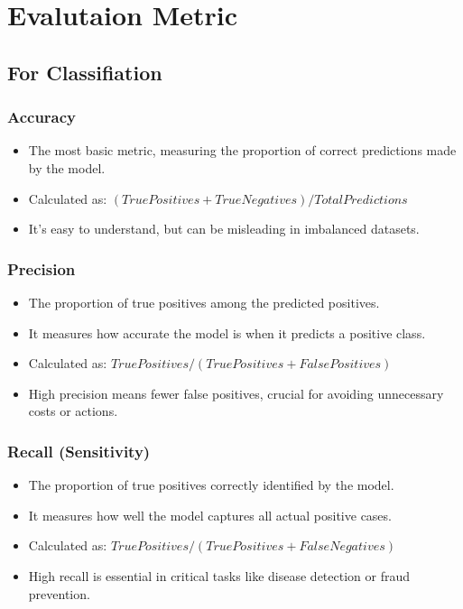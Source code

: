 \section{Evalutaion Metric}
    \subsection{For Classifiation}
        \subsubsection{Accuracy}
            \begin{itemize}
                \item The most basic metric, measuring the proportion of correct predictions made by the model.
                \item Calculated as: $(True Positives + True Negatives) / Total Predictions$
                \item It's easy to understand, but can be misleading in imbalanced datasets.
            \end{itemize}
        \subsubsection{Precision}
            \begin{itemize}
                \item The proportion of true positives among the predicted positives.
                \item It measures how accurate the model is when it predicts a positive class.
                \item Calculated as: $True Positives / (True Positives + False Positives)$
                \item High precision means fewer false positives, crucial for avoiding unnecessary costs or actions.
            \end{itemize}      
        \subsubsection{Recall (Sensitivity)}
            \begin{itemize}
                \item The proportion of true positives correctly identified by the model.
                \item It measures how well the model captures all actual positive cases.
                \item Calculated as: $True Positives / (True Positives + False Negatives)$
                \item High recall is essential in critical tasks like disease detection or fraud prevention.
            \end{itemize}
